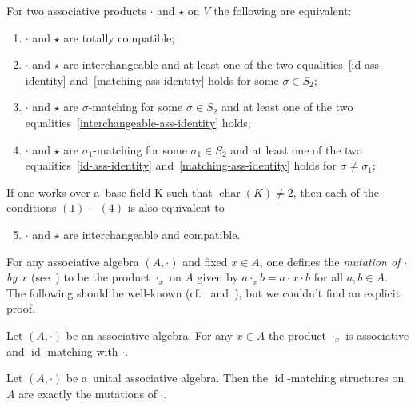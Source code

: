 \documentclass{jonasart}
\DeclareMathOperator{\ch}{char}
\DeclareMathOperator{\id}{id}
\begin{document}
	\begin{remark}
		For two associative products $\cdot$ and $\star$ on $V$ the following are equivalent:
		\begin{enumerate}
			\item[$\textrm{(1)}$] $\cdot$ and $\star$ are totally compatible;
			\item[$\textrm{(2)}$] $\cdot$ and $\star$ are interchangeable and at least one of the two equalities~\ref{id-ass-identity} and~\ref{matching-ass-identity} holds for some $\sigma\in S_2$;
			\item[$\textrm{(3)}$] $\cdot$ and $\star$ are $\sigma$-matching for some $\sigma\in S_2$ and at least one of the two equalities~\ref{interchangeable-ass-identity} holds;
			\item[$\textrm{(4)}$] $\cdot$ and $\star$ are $\sigma_1$-matching for some $\sigma_1\in S_2$ and at least one of the two equalities~\ref{id-ass-identity} and~\ref{matching-ass-identity} holds for $\sigma\ne\sigma_1$;
		\end{enumerate}
		If one works over a~base field K such that $\ch(K)\ne 2$, then each of the conditions $(1)-(4)$ is also equivalent to
		\begin{enumerate}
			\setcounter{enumi}{4}
			\item[$\textrm{(5)}$] $\cdot$ and $\star$ are interchangeable and compatible.
		\end{enumerate}
	\end{remark}

	For any associative algebra $(A,\cdot)$ and fixed $x\in A$, one defines the \textit{mutation of $\cdot$ by $x$} (see~\cite{ElduqueMyung}) to be the product $\cdot_x$ on $A$ given by $a\cdot_x b=a\cdot x\cdot b$ for all $a,b\in A$. The following should be well-known (cf.~\cite[Formula (9)]{Carinena-Grabowski-Marmo2000} and~\cite[Example 2.2]{Odesskii-Sokolov06}), but we couldn't find an explicit proof.

	\begin{lemma}

		Let $(A,\cdot)$ be an associative algebra. For any $x\in A$ the product $\cdot_x$ is associative and $\id$-matching with $\cdot$.
	\end{lemma}

	\begin{proposition}\label{id=mutation}
		Let $(A,\cdot)$ be a~unital associative algebra. Then the $\id$-matching structures on $A$ are exactly the mutations of $\cdot$.
	\end{proposition}
\end{document}
